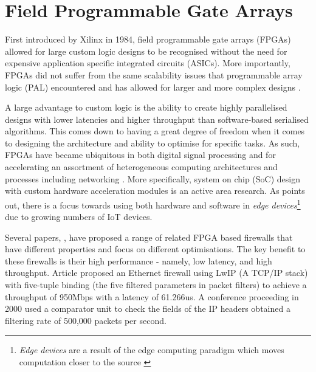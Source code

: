 \section{Field Programmable Gate Arrays}
\label{subsection:fpga}	
First introduced by Xilinx in 1984, field programmable gate arrays (FPGAs) allowed for large custom logic designs to be recognised without the need for 
expensive application specific integrated circuits (ASICs). More importantly, FPGAs did not suffer from the same scalability issues that
programmable array logic (PAL) encountered and has allowed for larger and more complex designs \cite{30YearsOfFPGA}. 

A large advantage to custom logic is the ability to create highly parallelised designs with lower latencies and higher throughput than software-based serialised algorithms. This comes down to 
having a great degree of freedom when it comes to designing the architecture and ability to optimise for specific tasks.
As such, FPGAs have became ubiquitous in both digital signal processing and for accelerating an assortment of heterogeneous computing architectures and processes including networking \cite{FPGAComputing}.
More specifically, system on chip (SoC) design with custom hardware acceleration modules is an active area research. As \cite{FPGAComputing} points out, there is a focus towards using both hardware and software in \textit{edge devices}\footnote[1]{\textit{Edge devices} are a result of the edge computing paradigm which moves computation closer to the source \cite{EdgeComputing}} due to growing numbers of IoT devices.


Several papers, \cite{LwIPFPGAFirewall} \cite{IPFPGAFirewall2000} \cite{packetFilteringFPGA}, have proposed a range of related FPGA based firewalls that have different properties and focus on different optimisations. The key benefit to these firewalls is their high performance - namely, low latency, and high throughput. 
Article \cite{LwIPFPGAFirewall} proposed an Ethernet firewall using LwIP (A TCP/IP stack) with five-tuple binding (the five filtered parameters in packet filters) 
to achieve a throughput of 950Mbps with a latency of 61.266us. A conference proceeding in 2000 \cite{IPFPGAFirewall2000} used a comparator unit to check the fields of the IP headers obtained a filtering rate of 500,000 packets per second. 


